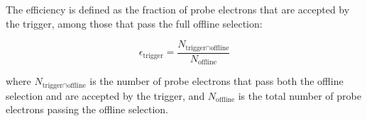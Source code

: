 The efficiency is defined as the fraction of probe electrons that are accepted by the trigger, among those that pass the full offline selection:

\begin{equation}
    \epsilon_{\text{trigger}} = \frac{N_{\text{trigger} \cap \text{offline}}}{N_{\text{offline}}}
\end{equation}

where \( N_{\text{trigger} \cap \text{offline}} \) is the number of probe electrons that pass both the offline selection and are accepted by the trigger, and \( N_{\text{offline}} \) is the total number of probe electrons passing the offline selection.







